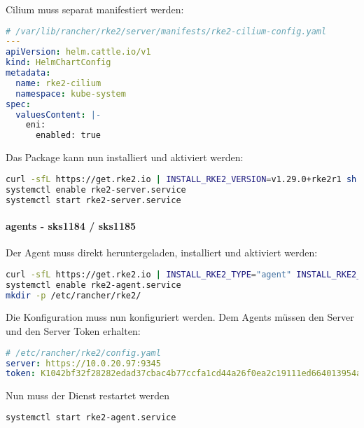 Cilium muss separat manifestiert werden:
\lstset{style=gra_codestyle}
\begin{lstlisting}[language=yaml, caption=rke2 server - cilium-config.yaml,captionpos=b,label={lst:rke2-server-cilium-config.yaml},breaklines=true]
# /var/lib/rancher/rke2/server/manifests/rke2-cilium-config.yaml
---
apiVersion: helm.cattle.io/v1
kind: HelmChartConfig
metadata:
  name: rke2-cilium
  namespace: kube-system
spec:
  valuesContent: |-
    eni:
      enabled: true
\end{lstlisting}

Das Package kann nun installiert und aktiviert werden:
\lstset{style=gra_codestyle}
\begin{lstlisting}[language=bash, caption=rke2 server installieren,captionpos=b,label={lst:install-rke2-server},breaklines=true]
curl -sfL https://get.rke2.io | INSTALL_RKE2_VERSION=v1.29.0+rke2r1 sh -
systemctl enable rke2-server.service
systemctl start rke2-server.service
\end{lstlisting}

\paragraph{agents - sks1184 / sks1185}
Der Agent muss direkt heruntergeladen, installiert und aktiviert werden:
\lstset{style=gra_codestyle}
\begin{lstlisting}[language=bash, caption=rke2 agenten installieren,captionpos=b,label={lst:install-rke2-agent},breaklines=true]
curl -sfL https://get.rke2.io | INSTALL_RKE2_TYPE="agent" INSTALL_RKE2_VERSION=v1.29.0+rke2r1 sh -
systemctl enable rke2-agent.service
mkdir -p /etc/rancher/rke2/
\end{lstlisting}

Die Konfiguration muss nun konfiguriert werden.
Dem Agents müssen den Server und den Server Token erhalten:
\lstset{style=gra_codestyle}
\begin{lstlisting}[language=yaml, caption=rke2 agent - config.yaml,captionpos=b,label={lst:rke2-agent-config.yaml},breaklines=true]
# /etc/rancher/rke2/config.yaml
server: https://10.0.20.97:9345
token: K1042bf32f28282edad37cbac4b77ccfa1cd44a26f0ea2c19111ed664013954a326::server:7a430a28b29501b778543f0882a156b8
\end{lstlisting}

Nun muss der Dienst restartet werden
\lstset{style=gra_codestyle}
\begin{lstlisting}[language=bash, caption=-rke2 agent service restart,captionpos=b,label={lst:rke2-agent-service-restart},breaklines=true]
systemctl start rke2-agent.service
\end{lstlisting}

